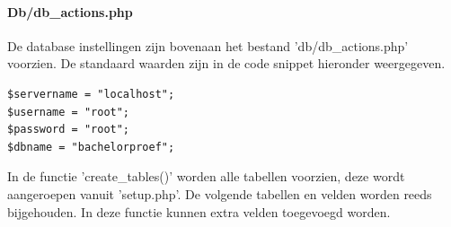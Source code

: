 \paragraph{Db/db\_actions.php}
\label{sec:onderzoek-evaluatietool-setup-db}

De database instellingen zijn bovenaan het bestand 'db/db\_actions.php' voorzien. De standaard waarden zijn in de code snippet hieronder weergegeven.

\begin{lstlisting}
$servername = "localhost";
$username = "root";
$password = "root";
$dbname = "bachelorproef";
\end{lstlisting}

In de functie 'create\_tables()' worden alle tabellen voorzien, deze wordt aangeroepen vanuit 'setup.php'. De volgende tabellen en velden worden reeds bijgehouden. In deze functie kunnen extra velden toegevoegd worden.

